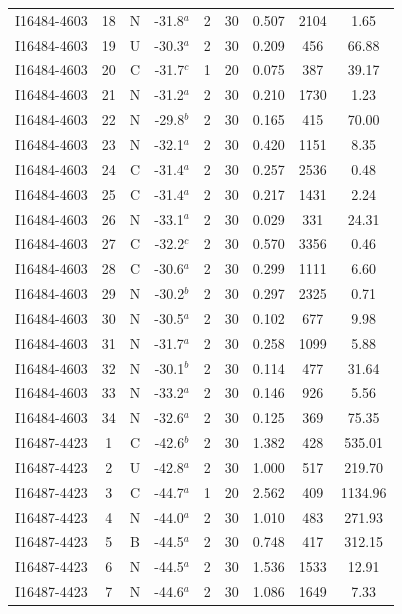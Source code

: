 \begin{table}
\begin{tabular}{ccccccccc}
I16484-4603 & 18 & N & -31.8$^{a}$ & 2 & 30 & 0.507 & 2104 & 1.65 \\
I16484-4603 & 19 & U & -30.3$^{a}$ & 2 & 30 & 0.209 & 456 & 66.88 \\
I16484-4603 & 20 & C & -31.7$^{c}$ & 1 & 20 & 0.075 & 387 & 39.17 \\
I16484-4603 & 21 & N & -31.2$^{a}$ & 2 & 30 & 0.210 & 1730 & 1.23 \\
I16484-4603 & 22 & N & -29.8$^{b}$ & 2 & 30 & 0.165 & 415 & 70.00 \\
I16484-4603 & 23 & N & -32.1$^{a}$ & 2 & 30 & 0.420 & 1151 & 8.35 \\
I16484-4603 & 24 & C & -31.4$^{a}$ & 2 & 30 & 0.257 & 2536 & 0.48 \\
I16484-4603 & 25 & C & -31.4$^{a}$ & 2 & 30 & 0.217 & 1431 & 2.24 \\
I16484-4603 & 26 & N & -33.1$^{a}$ & 2 & 30 & 0.029 & 331 & 24.31 \\
I16484-4603 & 27 & C & -32.2$^{c}$ & 2 & 30 & 0.570 & 3356 & 0.46 \\
I16484-4603 & 28 & C & -30.6$^{a}$ & 2 & 30 & 0.299 & 1111 & 6.60 \\
I16484-4603 & 29 & N & -30.2$^{b}$ & 2 & 30 & 0.297 & 2325 & 0.71 \\
I16484-4603 & 30 & N & -30.5$^{a}$ & 2 & 30 & 0.102 & 677 & 9.98 \\
I16484-4603 & 31 & N & -31.7$^{a}$ & 2 & 30 & 0.258 & 1099 & 5.88 \\
I16484-4603 & 32 & N & -30.1$^{b}$ & 2 & 30 & 0.114 & 477 & 31.64 \\
I16484-4603 & 33 & N & -33.2$^{a}$ & 2 & 30 & 0.146 & 926 & 5.56 \\
I16484-4603 & 34 & N & -32.6$^{a}$ & 2 & 30 & 0.125 & 369 & 75.35 \\
I16487-4423 & 1 & C & -42.6$^{b}$ & 2 & 30 & 1.382 & 428 & 535.01 \\
I16487-4423 & 2 & U & -42.8$^{a}$ & 2 & 30 & 1.000 & 517 & 219.70 \\
I16487-4423 & 3 & C & -44.7$^{a}$ & 1 & 20 & 2.562 & 409 & 1134.96 \\
I16487-4423 & 4 & N & -44.0$^{a}$ & 2 & 30 & 1.010 & 483 & 271.93 \\
I16487-4423 & 5 & B & -44.5$^{a}$ & 2 & 30 & 0.748 & 417 & 312.15 \\
I16487-4423 & 6 & N & -44.5$^{a}$ & 2 & 30 & 1.536 & 1533 & 12.91 \\
I16487-4423 & 7 & N & -44.6$^{a}$ & 2 & 30 & 1.086 & 1649 & 7.33 \\

\end{tabular}
\end{table}
